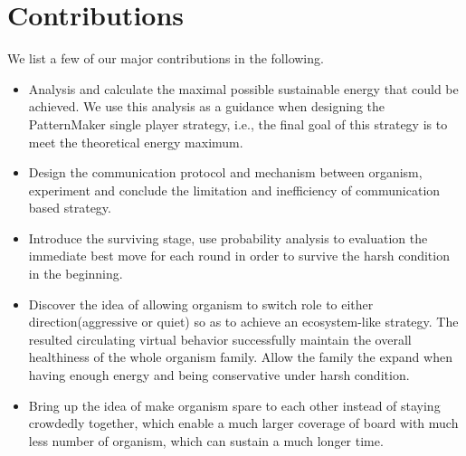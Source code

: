 \section{Contributions}
\label{sec:contribution}
We list a few of our major contributions in the following.
\begin{itemize}
\item Analysis and calculate the maximal possible sustainable energy that could be achieved.
We use this analysis as a guidance when designing the PatternMaker single player strategy, i.e., the final goal of this strategy is to meet the theoretical energy maximum.
\item Design the communication protocol and mechanism between organism, experiment and conclude the limitation and inefficiency of communication based strategy.
\item Introduce the surviving stage, use probability analysis to evaluation the immediate best move for each round in order to survive the harsh condition in the beginning.
\item Discover the idea of allowing organism to switch role to either direction(aggressive or quiet) so as to achieve an ecosystem-like strategy. The resulted circulating virtual behavior successfully maintain the overall healthiness of the whole organism family.
    Allow the family the expand when having enough energy and being conservative under harsh condition.
\item Bring up the idea of make organism spare to each other instead of staying crowdedly together, which enable a much larger coverage of board with much less number of organism, which can sustain a much longer time.
\end{itemize}